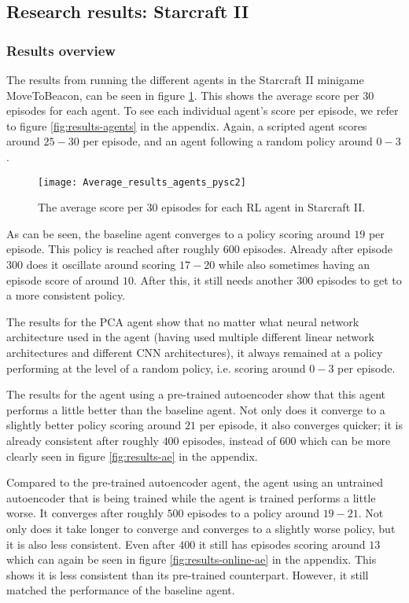 \subsection{Research results: Starcraft II}\label{research-results-pysc2}
\subsubsection{Results overview}
The results from running the different agents in the Starcraft II minigame MoveToBeacon, can be seen in figure \ref{fig:results-pysc2-average}. This shows the average score per $30$ episodes for each agent. To see each individual agent's score per episode, we refer to figure \ref{fig:results-agents} in the appendix. Again, a scripted agent scores around $25-30$ per episode, and an agent following a random policy around $0-3$.

\begin{figure}[h!]
	\centering
	\texttt{[image: Average\_results\_agents\_pysc2]}	
	\caption{The average score per 30 episodes for each RL agent in Starcraft II.}
	\label{fig:results-pysc2-average}
\end{figure}

As can be seen, the baseline agent converges to a policy scoring around $19$ per episode. This policy is reached after roughly $600$ episodes. Already after episode $300$ does it oscillate around scoring $17-20$ while also sometimes having an episode score of around $10$. After this, it still needs another $300$ episodes to get to a more consistent policy.

The results for the PCA agent show that no matter what neural network architecture used in the agent (having used multiple different linear network architectures and different CNN architectures), it always remained at a policy performing at the level of a random policy, i.e. scoring around $0-3$ per episode.

The results for the agent using a pre-trained autoencoder show that this agent performs a little better than the baseline agent. Not only does it converge to a slightly better policy scoring around $21$ per episode, it also converges quicker; it is already consistent after roughly $400$ episodes, instead of $600$ which can be more clearly seen in figure \ref{fig:results-ae} in the appendix. 

Compared to the pre-trained autoencoder agent, the agent using an untrained autoencoder that is being trained while the agent is trained performs a little worse. It converges after roughly $500$ episodes to a policy around $19-21$. Not only does it take longer to converge and converges to a slightly worse policy, but it is also less consistent. Even after $400$ it still has episodes scoring around $13$ which can again be seen in figure \ref{fig:results-online-ae} in the appendix. This shows it is less consistent than its pre-trained counterpart. However, it still matched the performance of the baseline agent.

